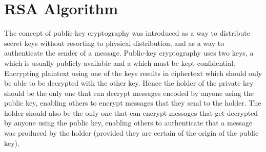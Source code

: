 
\section{RSA Algorithm}\label{Se:RSAAlgorithm}


The concept of public-key cryptography was introduced as a way to
distribute secret keys without resorting to physical distribution,
and as a way to authenticate the sender of a message.
Public-key cryptography uses two keys, a  which is
usually publicly available and a  which must
be kept confidential. Encrypting plaintext using one of the keys
results in ciphertext which should only be able to be decrypted
with the other key. Hence the holder of the private key should be the
only one that can decrypt messages encoded by anyone using the public key,
enabling others to encrypt messages that they send to the holder.
The holder should also be the only one that can encrypt messages that
get decrypted by anyone using the public key, enabling others
to authenticate that a message was produced by the holder
(provided they are certain of the origin of the public key).

